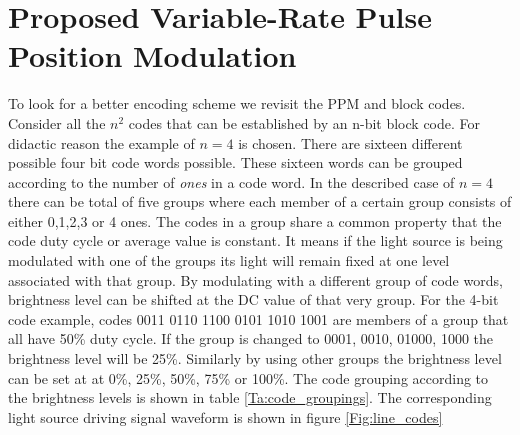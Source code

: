 \section{Proposed Variable-Rate Pulse Position Modulation}
To look for a better encoding scheme we revisit the PPM and block codes. Consider all the $n^2$ codes that can be established by an n-bit block code. For didactic reason the example of $n=4$ is chosen. There are sixteen different possible four bit code words possible. These sixteen words can be grouped according to the number of \emph{ones} in a code word. In the described case of $n=4$ there can be total of five groups where each member of a certain group consists of either 0,1,2,3 or 4 ones. The codes in a group share a common property that the code duty cycle or average value is constant. It means if the light source is being modulated with one of the groups its light will remain fixed at one level associated with that group. By modulating with a different group of code words, brightness level can be shifted at the DC value of that very group. For the 4-bit code example, codes 0011 0110 1100 0101 1010 1001 are members of a group that all have 50\% duty cycle. If the group is changed to 0001, 0010, 01000, 1000 the brightness level will be 25\%.  Similarly by using other groups the brightness level can be set at at 0\%, 25\%, 50\%, 75\% or 100\%.  The code grouping according to the brightness levels is shown in table \ref{Ta:code_groupings}. The corresponding light source driving signal waveform is shown in figure \ref{Fig:line_codes}

